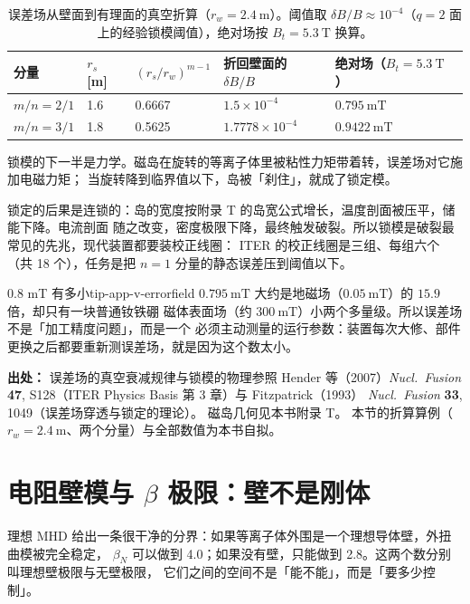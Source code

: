 \begin{table}[htbp]
\centering
\small
\caption{误差场从壁面到有理面的真空折算（$r_w=2.4\ \mathrm{m}$）。阈值取
$\delta B/B\approx10^{-4}$（$q=2$ 面上的经验锁模阈值），绝对场按 $B_t=5.3\ \mathrm{T}$
换算。}
\label{tab:app-v-errorfield}
\begin{tabular}{@{}p{2.3cm}p{2.1cm}p{2.5cm}p{3.0cm}p{3.1cm}@{}}
\toprule
分量 & $r_s$ [m] & $(r_s/r_w)^{m-1}$ & 折回壁面的 $\delta B/B$ & 绝对场（$B_t=5.3\ \mathrm{T}$） \\
\midrule
$m/n=2/1$ & 1.6 & 0.6667 & $1.5\times10^{-4}$ & $0.795\ \mathrm{mT}$ \\
$m/n=3/1$ & 1.8 & 0.5625 & $1.7778\times10^{-4}$ & $0.9422\ \mathrm{mT}$ \\
\bottomrule
\end{tabular}

\end{table}

锁模的下一半是力学。磁岛在旋转的等离子体里被粘性力矩带着转，误差场对它施加电磁力矩；
当旋转降到临界值以下，岛被「刹住」，就成了锁定模。

锁定的后果是连锁的：岛的宽度按附录 T 的岛宽公式增长，温度剖面被压平，储能下降。电流剖面
随之改变，密度极限下降，最终触发破裂。所以锁模是破裂最常见的先兆，现代装置都要装校正线圈：
ITER 的校正线圈是三组、每组六个（共 18 个），任务是把 $n=1$ 分量的静态误差压到阈值以下。

\begin{tip}{0.8 mT 有多小}{tip-app-v-errorfield}
$0.795\ \mathrm{mT}$ 大约是地磁场（$0.05\ \mathrm{mT}$）的 $15.9$ 倍，却只有一块普通钕铁硼
磁体表面场（约 $300\ \mathrm{mT}$）小两个多量级。所以误差场不是「加工精度问题」，而是一个
必须主动测量的运行参数：装置每次大修、部件更换之后都要重新测误差场，就是因为这个数太小。
\end{tip}

{\footnotesize
\textbf{出处：} 误差场的真空衰减规律与锁模的物理参照 Hender 等（2007）\textit{Nucl.\
Fusion} \textbf{47}, S128（ITER Physics Basis 第 3 章）与 Fitzpatrick（1993）
\textit{Nucl.\ Fusion} \textbf{33}, 1049（误差场穿透与锁定的理论）。
磁岛几何见本书附录 T。
本节的折算算例（$r_w=2.4\ \mathrm{m}$、两个分量）与全部数值为本书自拟。
}

\section{电阻壁模与 \texorpdfstring{$\beta$}{β} 极限：壁不是刚体}
\label{sec:app-v-rwm}

理想 MHD 给出一条很干净的分界：如果等离子体外围是一个理想导体壁，外扭曲模被完全稳定，
$\beta_N$ 可以做到 4.0；如果没有壁，只能做到 2.8。这两个数分别叫理想壁极限与无壁极限，
它们之间的空间不是「能不能」，而是「要多少控制」。

